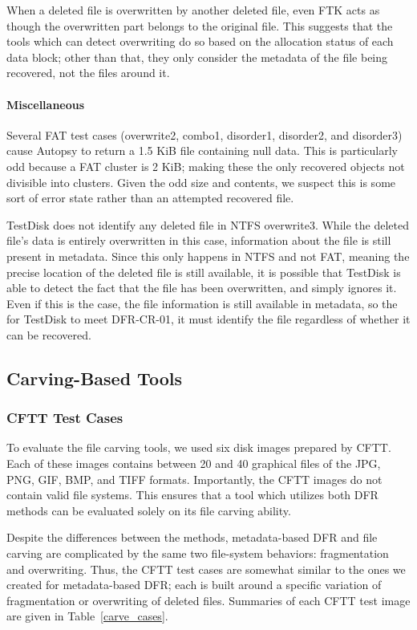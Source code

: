 When a deleted file is overwritten by another deleted file, even FTK acts as though the overwritten part belongs to the original file.
This suggests that the tools which can detect overwriting do so based on the allocation status of each data block; other than that, they only consider the metadata of the file being recovered, not the files around it.

\paragraph{Miscellaneous}
Several FAT test cases (overwrite2, combo1, disorder1, disorder2, and disorder3) cause Autopsy to return a 1.5 KiB file containing null data.
This is particularly odd because a FAT cluster is 2 KiB; making these the only recovered objects not divisible into clusters.
Given the odd size and contents, we suspect this is some sort of error state rather than an attempted recovered file.

TestDisk does not identify any deleted file in NTFS overwrite3.
While the deleted file's data is entirely overwritten in this case, information about the file is still present in metadata.
Since this only happens in NTFS and not FAT, meaning the precise location of the deleted file is still available, it is possible that TestDisk is able to detect the fact that the file has been overwritten, and simply ignores it.
Even if this is the case, the file information is still available in metadata, so the for TestDisk to meet DFR-CR-01, it must identify the file regardless of whether it can be recovered.


\subsection{Carving-Based Tools}

\subsubsection{CFTT Test Cases}
To evaluate the file carving tools, we used six disk images prepared by CFTT\cite{cftt_carving_images}.
Each of these images contains between 20 and 40 graphical files of the JPG, PNG, GIF, BMP, and TIFF formats.
Importantly, the CFTT images do not contain valid file systems.
This ensures that a tool which utilizes both DFR methods can be evaluated solely on its file carving ability.

Despite the differences between the methods, metadata-based DFR and file carving are complicated by the same two file-system behaviors: fragmentation and overwriting. Thus, the CFTT test cases are somewhat similar to the ones we created for metadata-based DFR; each is built around a specific variation of fragmentation or overwriting of deleted files.
Summaries of each CFTT test image are given in Table~\ref{carve_cases}.

